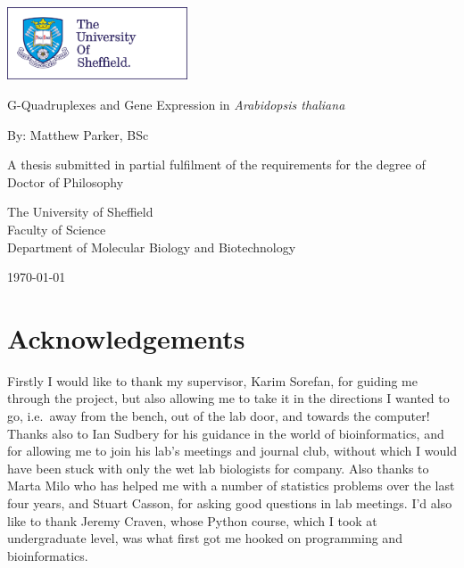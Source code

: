 \documentclass[12pt,a4paper,]{report}
\date{}
\begin{document}
\begin{titlepage}
    \begin{center}

        \includegraphics[width=0.4\textwidth]{title_pages/imgs/uos_logo_colour.png}
        
        \vspace*{2.5cm}
        
        \huge
        G-Quadruplexes and Gene Expression in \textit{Arabidopsis thaliana}
        
        \vspace{1.5cm}
        
        \normalsize
        By:
        \Large
        Matthew Parker, BSc

        \vspace{1.5cm}

        \normalsize
        A thesis submitted in partial fulfilment of the requirements for the degree of\\
Doctor of Philosophy 

        
        \vfill
        
        \normalsize
        The University of Sheffield\\
        Faculty of Science\\
        Department of Molecular Biology and Biotechnology\\

        \vspace{0.8cm}
        
        \normalsize
        \today


    \end{center}
\end{titlepage}

\newpage

\section*{Acknowledgements} 

Firstly I would like to thank my supervisor, Karim Sorefan, for guiding
me through the project, but also allowing me to take it in the
directions I wanted to go, i.e.~away from the bench, out of the lab
door, and towards the computer! Thanks also to Ian Sudbery for his
guidance in the world of bioinformatics, and for allowing me to join his
lab's meetings and journal club, without which I would have been stuck
with only the wet lab biologists for company. Also thanks to Marta Milo
who has helped me with a number of statistics problems over the last
four years, and Stuart Casson, for asking good questions in lab
meetings. I'd also like to thank Jeremy Craven, whose Python course,
which I took at undergraduate level, was what first got me hooked on
programming and bioinformatics.
\end{document}
